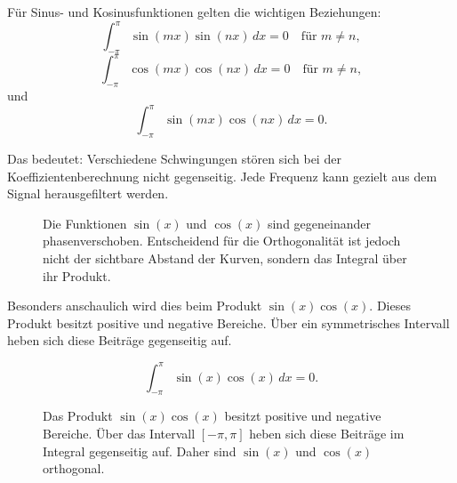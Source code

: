 Für Sinus- und Kosinusfunktionen gelten die wichtigen Beziehungen:
\[
\int_{-\pi}^{\pi} \sin(mx)\sin(nx)\,dx=0
\quad \text{für } m\neq n,
\]
\[
\int_{-\pi}^{\pi} \cos(mx)\cos(nx)\,dx=0
\quad \text{für } m\neq n,
\]
und
\[
\int_{-\pi}^{\pi} \sin(mx)\cos(nx)\,dx=0.
\]

Das bedeutet:
Verschiedene Schwingungen stören sich bei der Koeffizientenberechnung nicht gegenseitig.
Jede Frequenz kann gezielt aus dem Signal herausgefiltert werden.
\FloatBarrier
\begin{figure}[H]
	\centering
	\caption{Die Funktionen $\sin(x)$ und $\cos(x)$ sind gegeneinander phasenverschoben.
		Entscheidend für die Orthogonalität ist jedoch nicht der sichtbare Abstand der Kurven,
		sondern das Integral über ihr Produkt.}
	\label{fig:sin_cos_orthogonalitaet}
\end{figure}

Besonders anschaulich wird dies beim Produkt \(\sin(x)\cos(x)\).
Dieses Produkt besitzt positive und negative Bereiche.
Über ein symmetrisches Intervall heben sich diese Beiträge gegenseitig auf.

\[
\int_{-\pi}^{\pi}\sin(x)\cos(x)\,dx=0.
\]
\FloatBarrier
\begin{figure}[H]
	\centering
	\caption{Das Produkt $\sin(x)\cos(x)$ besitzt positive und negative Bereiche.
		Über das Intervall $[-\pi,\pi]$ heben sich diese Beiträge im Integral gegenseitig auf.
		Daher sind $\sin(x)$ und $\cos(x)$ orthogonal.}
	\label{fig:sin_cos_produkt}
\end{figure}

